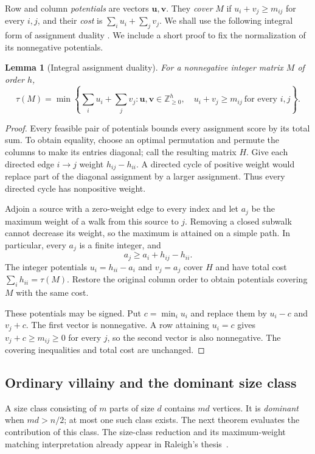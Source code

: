 \documentclass[10pt,a4paper]{amsart}
\numberwithin{equation}{section}
\newtheorem{lemma}[theorem]{Lemma}
\theoremstyle{definition}
\theoremstyle{remark}
\begin{document}
Row and column \emph{potentials} are vectors $\mathbf u,\mathbf v$.
They \emph{cover} $M$ if $u_i+v_j\ge m_{ij}$ for every $i,j$, and their
\emph{cost} is $\sum_i u_i+\sum_jv_j$.
We shall use the following integral form of assignment duality
\cite{kuhn1955}. We include a short proof to fix the normalization
of its nonnegative potentials.

\begin{lemma}[Integral assignment duality]\label{lem:assignment-duality}
For a nonnegative integer matrix $M$ of order $h$,
\[
 \tau(M)=\min\left\{
 \sum_i u_i+\sum_j v_j:
 \mathbf u,\mathbf v\in\mathbb Z_{\ge0}^h,
 \quad u_i+v_j\ge m_{ij}\ \text{for every }i,j
 \right\}.
\]
\end{lemma}
\begin{proof}
Every feasible pair of potentials bounds every assignment score by its
total sum. To obtain equality, choose an optimal permutation and permute
the columns to make its entries diagonal; call the resulting matrix $H$.
Give each directed edge $i\to j$ weight $h_{ij}-h_{ii}$. A directed cycle
of positive weight would replace part of the diagonal assignment by a
larger assignment. Thus every directed cycle has nonpositive weight.

Adjoin a source with a zero-weight edge to every index and let $a_j$ be
the maximum weight of a walk from this source to $j$. Removing a closed
subwalk cannot decrease its weight, so the maximum is attained on a
simple path. In particular, every $a_j$ is a finite integer, and
\[
 a_j\ge a_i+h_{ij}-h_{ii}.
\]
The integer potentials $u_i=h_{ii}-a_i$ and $v_j=a_j$ cover $H$ and have
total cost $\sum_i h_{ii}=\tau(M)$. Restore the original column order to
obtain potentials covering $M$ with the same cost.

These potentials may be signed. Put $c=\min_i u_i$ and replace them by
$u_i-c$ and $v_j+c$. The first vector is nonnegative. A row attaining
$u_i=c$ gives $v_j+c\ge m_{ij}\ge0$ for every $j$, so the second vector
is also nonnegative. The covering inequalities and total cost are unchanged.
\end{proof}

\subsection{Ordinary villainy and the dominant size class}

A size class consisting of $m$ parts of size $d$ contains $md$ vertices.
It is \emph{dominant} when $md>n/2$; at most one such class exists. The next
theorem evaluates the contribution of this class. The size-class
reduction and its maximum-weight matching interpretation already
appear in Raleigh's thesis~\cite[Chapter~II]{raleigh2018}.
\end{document}
